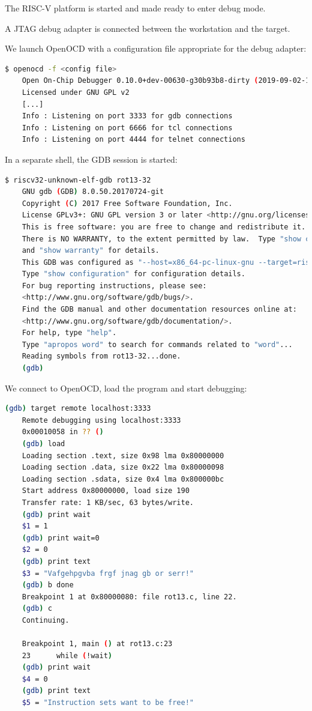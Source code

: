 \documentclass{article}
\begin{document}
    The RISC-V platform is started and made ready to enter debug mode.
    
    A JTAG debug adapter is connected between the workstation and the target.
    
    We launch OpenOCD with a configuration file appropriate for the debug adapter:
    
    \begin{lstlisting}[language=bash]
	$ openocd -f <config file>
	Open On-Chip Debugger 0.10.0+dev-00630-g30b93b8-dirty (2019-09-02-16:40)
	Licensed under GNU GPL v2
	[...]
	Info : Listening on port 3333 for gdb connections
	Info : Listening on port 6666 for tcl connections
	Info : Listening on port 4444 for telnet connections
    \end{lstlisting}
    
    \newpage
    In a separate shell, the GDB session is started:
    
    \begin{lstlisting}[language=bash]
	$ riscv32-unknown-elf-gdb rot13-32
	GNU gdb (GDB) 8.0.50.20170724-git
	Copyright (C) 2017 Free Software Foundation, Inc.
	License GPLv3+: GNU GPL version 3 or later <http://gnu.org/licenses/gpl.html>
	This is free software: you are free to change and redistribute it.
	There is NO WARRANTY, to the extent permitted by law.  Type "show copying"
	and "show warranty" for details.
	This GDB was configured as "--host=x86_64-pc-linux-gnu --target=riscv32-unknown-elf".
	Type "show configuration" for configuration details.
	For bug reporting instructions, please see:
	<http://www.gnu.org/software/gdb/bugs/>.
	Find the GDB manual and other documentation resources online at:
	<http://www.gnu.org/software/gdb/documentation/>.
	For help, type "help".
	Type "apropos word" to search for commands related to "word"...
	Reading symbols from rot13-32...done.
	(gdb) 
    \end{lstlisting}
    
    We connect to OpenOCD, load the program and start debugging:
    
    \begin{lstlisting}[language=bash]
	(gdb) target remote localhost:3333
	Remote debugging using localhost:3333
	0x00010058 in ?? ()
	(gdb) load
	Loading section .text, size 0x98 lma 0x80000000
	Loading section .data, size 0x22 lma 0x80000098
	Loading section .sdata, size 0x4 lma 0x800000bc
	Start address 0x80000000, load size 190
	Transfer rate: 1 KB/sec, 63 bytes/write.
	(gdb) print wait
	$1 = 1
	(gdb) print wait=0
	$2 = 0
	(gdb) print text
	$3 = "Vafgehpgvba frgf jnag gb or serr!"
	(gdb) b done
	Breakpoint 1 at 0x80000080: file rot13.c, line 22.
	(gdb) c
	Continuing.
	
	Breakpoint 1, main () at rot13.c:23
	23	    while (!wait)
	(gdb) print wait
	$4 = 0
	(gdb) print text
	$5 = "Instruction sets want to be free!"

    \end{lstlisting}
	
\end{document}
